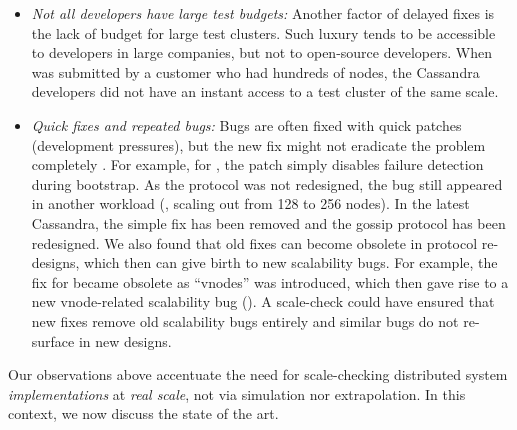 \begin{itemize}
\item {\em Not all developers have large test budgets:}
%
Another factor of delayed fixes is the lack of budget for large test clusters.
Such luxury tends to be accessible to developers in large companies, but not to
open-source developers. When \caone was submitted by a customer who had hundreds
of nodes, the Cassandra developers did not have an instant access to a test
cluster of the same scale.

\item {\em Quick fixes and repeated bugs:} Bugs are often fixed with quick
patches (development pressures), but the new fix might not eradicate the
problem completely \cite{Yin+11-FixesBecomeBugs}.
%
For example, for \caone, the patch simply disables failure detection during
bootstrap.  As the protocol was not redesigned, the bug still appeared in
another workload (\eg, scaling out from 128 to 256 nodes).
%
In the latest Cassandra, the simple fix has been removed and the gossip
protocol has been redesigned.
%
We also found that old fixes can become obsolete in protocol re-designs, which
then can give birth to new scalability bugs. 
%
For example, the fix for  became obsolete as ``vnodes'' was introduced,
which then gave rise to a new vnode-related scalability bug ().
%
A scale-check could have ensured that new fixes remove old scalability bugs
entirely and similar bugs do not re-surface in new designs.  

\end{itemize}


Our observations above accentuate the need for scale-checking distributed
system {\em implementations} at {\em real scale}, not via simulation nor
extrapolation.  In this context, we now discuss the state of the art.
\fi

